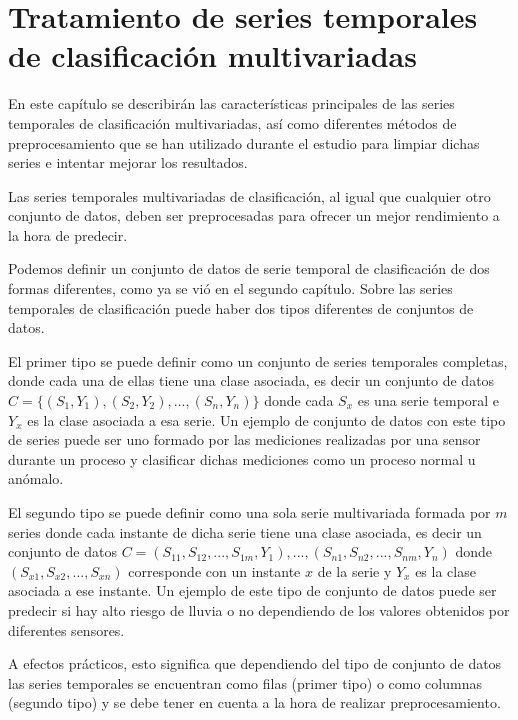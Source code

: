 \chapter{Tratamiento de series temporales de clasificación multivariadas}
En este capítulo se describirán las características principales de las series temporales de clasificación multivariadas, así como diferentes métodos de preprocesamiento que se han utilizado durante el estudio para limpiar dichas series e intentar mejorar los resultados.\newline

Las series temporales multivariadas de clasificación, al igual que cualquier otro conjunto de datos, deben ser preprocesadas para ofrecer un mejor rendimiento a la hora de predecir.\newline

Podemos definir un conjunto de datos de serie temporal de clasificación de dos formas diferentes, como ya se vió en el segundo capítulo. Sobre las series temporales de clasificación puede haber dos tipos diferentes de conjuntos de datos.\newline

El primer tipo se puede definir como un conjunto de series temporales completas, donde cada una de ellas tiene una clase asociada, es decir un conjunto de datos $C = \{ (S_1,Y_1), (S_2,Y_2), ..., (S_n,Y_n)\}$ donde cada $S_x$ es una serie temporal e $Y_x$ es la clase asociada a esa serie. Un ejemplo de conjunto de datos con este tipo de series puede ser uno formado por las mediciones realizadas por una sensor durante un proceso y clasificar dichas mediciones como un proceso normal u anómalo.\newline

El segundo tipo se puede definir como una sola serie multivariada formada por $m$ series donde cada instante de dicha serie tiene una clase asociada, es decir un conjunto de datos $C = {(S_{11},S_{12},...,S_{1m},Y_1),..., (S_{n1},S_{n2},...,S_{nm},Y_n)}$ donde $(S_{x1},S_{x2},...,S_{xn})$ corresponde con un instante $x$ de la serie y $Y_x$ es la clase asociada a ese instante. Un ejemplo de este tipo de conjunto de datos puede ser predecir si hay alto riesgo de lluvia o no dependiendo de los valores obtenidos por diferentes sensores.\newline

A efectos prácticos, esto significa que dependiendo del tipo de conjunto de datos las series temporales se encuentran como filas (primer tipo) o como columnas (segundo tipo) y se debe tener en cuenta a la hora de realizar preprocesamiento.\newline

